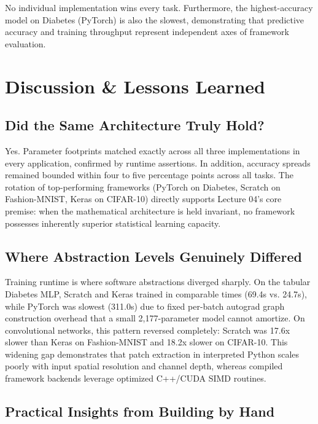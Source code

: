 \documentclass[11pt]{article}
\newcommand{\code}[1]{\texttt{\detokenize{#1}}}
\begin{document}
No individual implementation wins every task. Furthermore, the highest-accuracy model on Diabetes (PyTorch) is also the slowest, demonstrating that predictive accuracy and training throughput represent independent axes of framework evaluation.

\section{Discussion \& Lessons Learned}
\label{sec:discussion}

\subsection{Did the Same Architecture Truly Hold?}

Yes. Parameter footprints matched exactly across all three implementations in every application, confirmed by runtime assertions. In addition, accuracy spreads remained bounded within four to five percentage points across all tasks. The rotation of top-performing frameworks (PyTorch on Diabetes, Scratch on Fashion-MNIST, Keras on CIFAR-10) directly supports Lecture 04's core premise: when the mathematical architecture is held invariant, no framework possesses inherently superior statistical learning capacity.

\subsection{Where Abstraction Levels Genuinely Differed}

Training runtime is where software abstractions diverged sharply. On the tabular Diabetes MLP, Scratch and Keras trained in comparable times (69.4s vs. 24.7s), while PyTorch was slowest (311.0s) due to fixed per-batch autograd graph construction overhead that a small 2,177-parameter model cannot amortize. On convolutional networks, this pattern reversed completely: Scratch was 17.6x slower than Keras on Fashion-MNIST and 18.2x slower on CIFAR-10. This widening gap demonstrates that \code{im2col} patch extraction in interpreted Python scales poorly with input spatial resolution and channel depth, whereas compiled framework backends leverage optimized C++/CUDA SIMD routines.

\subsection{Practical Insights from Building by Hand}
\end{document}
